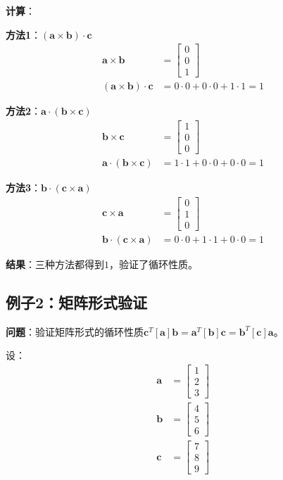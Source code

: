 \documentclass[12pt,a4paper]{article}
\begin{document}
\textbf{计算}：

\textbf{方法1}：$(\bm{a} \times \bm{b}) \cdot \bm{c}$
\begin{align}
\bm{a} \times \bm{b} &= \begin{bmatrix} 0 \\ 0 \\ 1 \end{bmatrix} \\
(\bm{a} \times \bm{b}) \cdot \bm{c} &= 0 \cdot 0 + 0 \cdot 0 + 1 \cdot 1 = 1
\end{align}

\textbf{方法2}：$\bm{a} \cdot (\bm{b} \times \bm{c})$
\begin{align}
\bm{b} \times \bm{c} &= \begin{bmatrix} 1 \\ 0 \\ 0 \end{bmatrix} \\
\bm{a} \cdot (\bm{b} \times \bm{c}) &= 1 \cdot 1 + 0 \cdot 0 + 0 \cdot 0 = 1
\end{align}

\textbf{方法3}：$\bm{b} \cdot (\bm{c} \times \bm{a})$
\begin{align}
\bm{c} \times \bm{a} &= \begin{bmatrix} 0 \\ 1 \\ 0 \end{bmatrix} \\
\bm{b} \cdot (\bm{c} \times \bm{a}) &= 0 \cdot 0 + 1 \cdot 1 + 0 \cdot 0 = 1
\end{align}

\textbf{结果}：三种方法都得到$1$，验证了循环性质。

\subsection{例子2：矩阵形式验证}

\textbf{问题}：验证矩阵形式的循环性质$\bm{c}^T [\bm{a}] \bm{b} = \bm{a}^T [\bm{b}] \bm{c} = \bm{b}^T [\bm{c}] \bm{a}$。

设：
\begin{align}
\bm{a} &= \begin{bmatrix} 1 \\ 2 \\ 3 \end{bmatrix} \\
\bm{b} &= \begin{bmatrix} 4 \\ 5 \\ 6 \end{bmatrix} \\
\bm{c} &= \begin{bmatrix} 7 \\ 8 \\ 9 \end{bmatrix}
\end{align}
\end{document}
